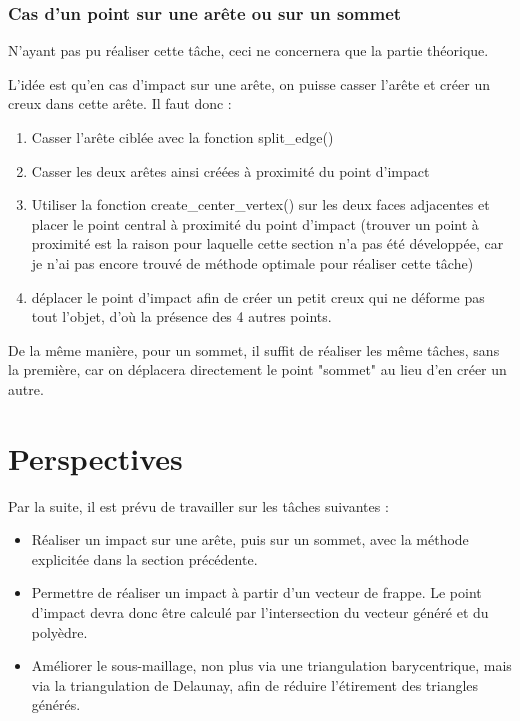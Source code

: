 \documentclass[a4paper,french]{report}
\begin{document}
			\subsection{Cas d'un point sur une arête ou sur un sommet}
				N'ayant pas pu réaliser cette tâche, ceci ne concernera que la partie théorique. \par 
				L'idée est qu'en cas d'impact sur une arête, on puisse casser l'arête et créer un creux dans cette arête. Il faut donc :
				\begin{enumerate}
					\item Casser l'arête ciblée avec la fonction split\_edge()
					\item Casser les deux arêtes ainsi créées à proximité du point d'impact
					\item Utiliser la fonction create\_center\_vertex() sur les deux faces adjacentes et placer le point central à proximité du point d'impact (trouver un point à proximité est la raison pour laquelle cette section n'a pas été développée, car je n'ai pas encore trouvé de méthode optimale pour réaliser cette tâche)
					\item déplacer le point d'impact afin de créer un petit creux qui ne déforme pas tout l'objet, d'où la présence des 4 autres points.
				\end{enumerate}
				De la même manière, pour un sommet, il suffit de réaliser les même tâches, sans la première, car on déplacera directement le point "sommet" au lieu d'en créer un autre.
	\chapter{Perspectives}
		Par la suite, il est prévu de travailler sur les tâches suivantes : 
		\begin{itemize}
			\item Réaliser un impact sur une arête, puis sur un sommet, avec la méthode explicitée dans la section précédente.
			\item Permettre de réaliser un impact à partir d'un vecteur de frappe. Le point d'impact devra donc être calculé par l'intersection du vecteur généré et du polyèdre. 
			\item Améliorer le sous-maillage, non plus via une triangulation barycentrique, mais via la triangulation de Delaunay, afin de réduire l'étirement des triangles générés.
		\end{itemize}
		
\end{document}
